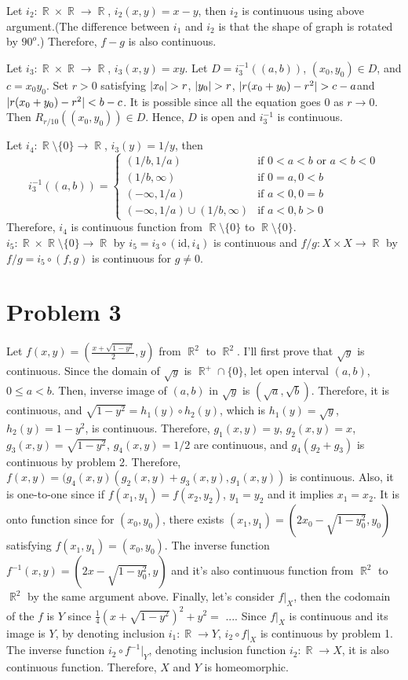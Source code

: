 \documentclass{article}
\DeclareMathOperator{\rr}{\mathbb{R}}
\DeclarePairedDelimiter\abs{\lvert}{\rvert}%
\begin{document}
Let $i_2:\rr\times\rr \rightarrow\rr $, $i_2(x,y)=x-y$, then $i_2$ is continuous using above argument.(The difference between $i_1$ and $i_2$ is that the shape of graph is rotated by $90^o$.) Therefore, $f-g$ is also continuous.

Let $i_3:\rr\times\rr \rightarrow\rr $, $i_3(x,y)=xy$. Let $D=i_3^{-1}\left((a,b)\right)$, $(x_0,y_0)\in D$, and $c=x_0y_0$. Set $r>0$ satisfying $\abs{x_0}>r$, $\abs{y_0}>r$, $\abs{r(x_0+y_0)-r^2}>c-a$and $\abs{r(x_0+y_0)-r^2}<b-c$. It is possible since all the equation goes $0$ as $r\rightarrow 0$. Then $R_{r/10}\left((x_0,y_0)\right)\in D$. Hence, $D$ is open and $i_3^{-1}$ is continuous.

Let $i_4:\rr\setminus\{0\} \rightarrow\rr $, $i_3(y)=1/y$, then
\begin{equation*}
i_3^{-1}((a,b))=
\begin{cases}
(1/b,1/a) & \text{if }0<a<b \text{ or }a<b<0\\
(1/b, \infty) & \text{if } 0=a,0<b \\
(-\infty, 1/a) & \text{if } a<0,0=b \\
(-\infty, 1/a)\cup (1/b,\infty) & \text{if } a<0, b>0
\end{cases}
\end{equation*}
Therefore, $i_4$ is continuous function from $\rr\setminus\{0\}$ to $\rr\setminus\{0\}$. $i_5:\rr\times \rr\setminus\{0\}\rightarrow \rr$ by $i_5=i_3 \circ (\text{id},i_4)$ is continuous and $f/g:X\times X\rightarrow \rr$ by $f/g=i_5 \circ (f,g)$ is continuous for $g\neq 0$.
\section*{Problem 3}
Let $f(x,y)=(\frac{x+\sqrt{1-y^2}}{2}, y)$ from $\rr^2$ to $\rr^2$. I'll first prove that $\sqrt{y}$ is continuous. Since the domain of $\sqrt{y}$ is $\rr^+\cap \{0\}$, let open interval $(a, b)$, $0\leq a<b$. Then, inverse image of $(a,b)$ in $\sqrt{y}$ is $(\sqrt{a}, \sqrt{b})$. Therefore, it is continuous, and $\sqrt{1-y^2}=h_1(y)\circ h_2(y)$, which is $h_1(y)=\sqrt{y}$, $h_2(y)=1-y^2$, is continuous. Therefore, $g_1(x,y)=y$, $g_2(x,y)=x$, $g_3(x,y)=\sqrt{1-y^2}$, $g_4(x,y)=1/2$ are continuous, and $g_4(g_2+g_3)$ is continuous by problem 2. Therefore, $f(x,y)=(g_4(x,y)(g_2(x,y)+g_3(x,y),g_1(x,y))$ is continuous. Also, it is one-to-one since if $f(x_1, y_1)=f(x_2,y_2)$, $y_1=y_2$ and it implies $x_1=x_2$. It is onto function since for $(x_0, y_0)$, there exists $(x_1,y_1)=(2x_0-\sqrt{1-y_0^2},y_0)$ satisfying $f(x_1,y_1)=(x_0,y_0)$. The inverse function $f^{-1}(x,y)=(2x-\sqrt{1-y_0^2}, y)$ and it's also continuous function from $\rr^2$ to $\rr^2$ by the same argument above. Finally, let's consider $f|_X$, then the codomain of the $f$ is $Y$ since $\frac{1}{4}(x+\sqrt{1-y^2})^2+y^2=$ .... Since $f|_X$ is continuous and its image is $Y$, by denoting inclusion $i_1:\rr\rightarrow Y$, $i_2\circ f|_X$ is continuous by problem 1. The inverse function $i_2\circ f^{-1}|_Y$, denoting inclusion function $i_2:\rr\rightarrow X$, it is also continuous function. Therefore, $X$ and $Y$ is homeomorphic.
\end{document}
